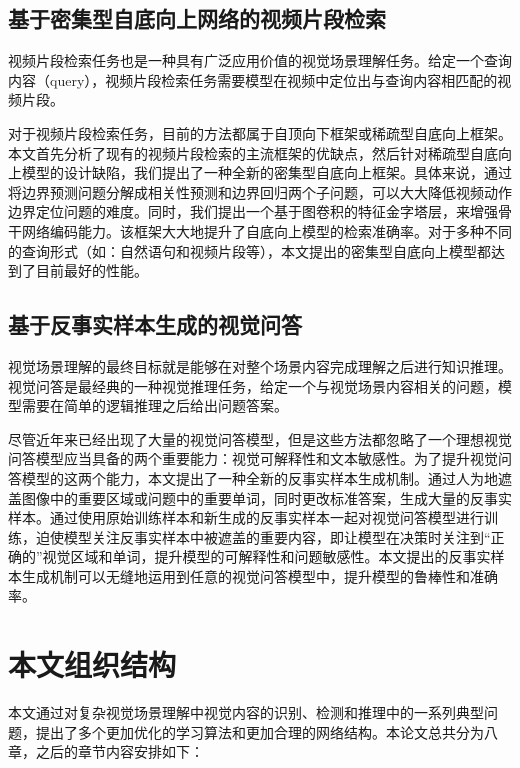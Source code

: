 \subsection{基于密集型自底向上网络的视频片段检索}

视频片段检索任务也是一种具有广泛应用价值的视觉场景理解任务。给定一个查询内容（query），视频片段检索任务需要模型在视频中定位出与查询内容相匹配的视频片段。

对于视频片段检索任务，目前的方法都属于自顶向下框架或稀疏型自底向上框架。本文首先分析了现有的视频片段检索的主流框架的优缺点，然后针对稀疏型自底向上模型的设计缺陷，我们提出了一种全新的密集型自底向上框架。具体来说，通过将边界预测问题分解成相关性预测和边界回归两个子问题，可以大大降低视频动作边界定位问题的难度。同时，我们提出一个基于图卷积的特征金字塔层，来增强骨干网络编码能力。该框架大大地提升了自底向上模型的检索准确率。对于多种不同的查询形式（如：自然语句和视频片段等），本文提出的密集型自底向上模型都达到了目前最好的性能。


\subsection{基于反事实样本生成的视觉问答}

视觉场景理解的最终目标就是能够在对整个场景内容完成理解之后进行知识推理。视觉问答是最经典的一种视觉推理任务，给定一个与视觉场景内容相关的问题，模型需要在简单的逻辑推理之后给出问题答案。

尽管近年来已经出现了大量的视觉问答模型，但是这些方法都忽略了一个理想视觉问答模型应当具备的两个重要能力：视觉可解释性和文本敏感性。为了提升视觉问答模型的这两个能力，本文提出了一种全新的反事实样本生成机制。通过人为地遮盖图像中的重要区域或问题中的重要单词，同时更改标准答案，生成大量的反事实样本。通过使用原始训练样本和新生成的反事实样本一起对视觉问答模型进行训练，迫使模型关注反事实样本中被遮盖的重要内容，即让模型在决策时关注到“正确的”视觉区域和单词，提升模型的可解释性和问题敏感性。本文提出的反事实样本生成机制可以无缝地运用到任意的视觉问答模型中，提升模型的鲁棒性和准确率。


\section{本文组织结构}
本文通过对复杂视觉场景理解中视觉内容的识别、检测和推理中的一系列典型问题，提出了多个更加优化的学习算法和更加合理的网络结构。本论文总共分为八章，之后的章节内容安排如下：

